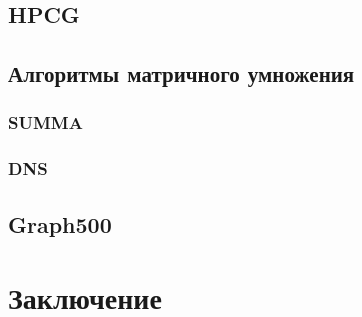 \documentclass[unicode, t, 11pt]{beamer}%
\begin{document}
					

	 		
		\subsection{HPCG}
		
		\subsection{Алгоритмы матричного умножения}
			\subsubsection{SUMMA}
			\subsubsection{DNS}
		\subsection{Graph500}
	\section{Заключение}
\end{document}
